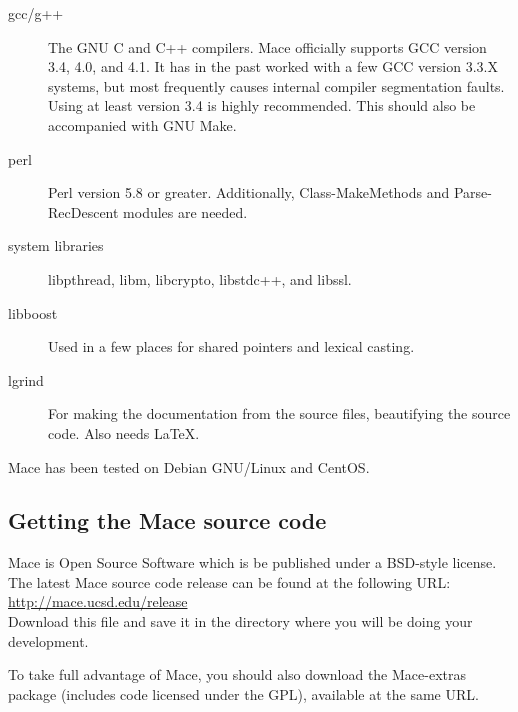 \begin{description}

\item[gcc/g++] The GNU C and C++ compilers.  Mace officially supports GCC
  version 3.4, 4.0, and 4.1.  It has in the past worked with a few GCC
  version 3.3.X systems, but most frequently causes internal compiler
  segmentation faults.  Using at least version 3.4 is highly
  recommended.  This should also be accompanied with GNU Make.

\item[perl] Perl version 5.8 or greater.  Additionally, Class-MakeMethods and Parse-RecDescent modules are needed.

\item[system libraries] libpthread, libm, libcrypto, libstdc++, and libssl.

\item[libboost] Used in a few places for shared pointers and lexical casting.

\item[lgrind] For making the documentation from the source files, beautifying 
  the source code.  Also needs LaTeX.

\end{description}

Mace has been tested on Debian GNU/Linux and CentOS.



\subsection{Getting the Mace source code}
\label{sec:downloading}

Mace is Open Source Software which is be published under a BSD-style license.
The latest Mace source code release can be found at the following URL: \\

\href{http://mace.ucsd.edu/release}{http://mace.ucsd.edu/release} \\

Download this file and save it in the directory where you will be
doing your development.

To take full advantage of Mace, you should also download the Mace-extras
package (includes code licensed under the GPL), available at the same URL. \\

